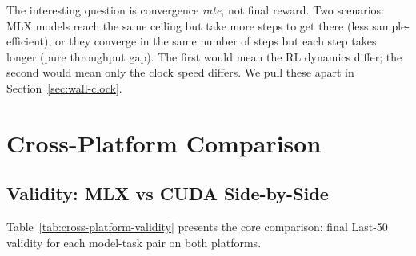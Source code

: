 \documentclass[11pt]{article}
\begin{document}
The interesting question is convergence \emph{rate}, not final reward.  Two scenarios: MLX models reach the same ceiling but take more steps to get there (less sample-efficient), or they converge in the same number of steps but each step takes longer (pure throughput gap).  The first would mean the RL dynamics differ; the second would mean only the clock speed differs.  We pull these apart in Section~\ref{sec:wall-clock}.


\section{Cross-Platform Comparison}
\label{sec:comparison}

\subsection{Validity: MLX vs CUDA Side-by-Side}

Table~\ref{tab:cross-platform-validity} presents the core comparison: final Last-50 validity for each model-task pair on both platforms.
\end{document}
